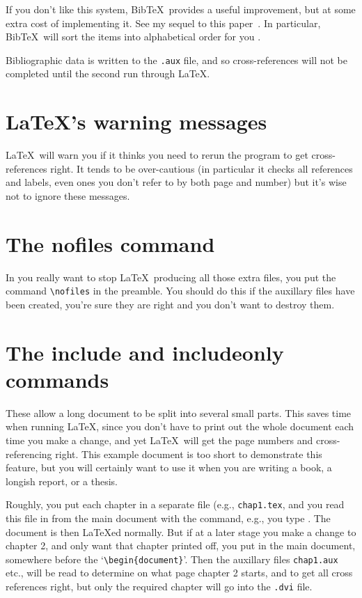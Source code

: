 \documentclass[a4paper]{article}
\begin{document}
If you don't like this system, {\sc Bib}\TeX\ provides
a useful improvement, but at some extra cost of implementing
it. See my sequel to this paper~\cite{extraref}.
In particular, {\sc Bib}\TeX\ will sort the items into
alphabetical order for you \cite{extraref,bibtexguide}.

Bibliographic data is written to the \texttt{.aux} file, and so
cross-references will not be completed until the second run 
through \LaTeX.

\section{\LaTeX's warning messages}

\LaTeX\ will warn you if it thinks you need to rerun 
the program to get cross-references right.  It tends to be
over-cautious (in particular it checks all references and labels,
even ones you don't refer to by both page and number) but it's
wise not to ignore these messages.

\section{The nofiles command}\label{nofilessect}

In you really want to stop \LaTeX\ producing all those extra
files, you put the command \verb|\nofiles| in the preamble. You should do this
if the auxillary files have been created, you're sure they are right
and you don't want to destroy them.

\section{The include and includeonly commands}

These allow a long document to be split into several small parts.
This saves time when running \LaTeX, since you don't have to print out
the whole document each time you make a change, and yet \LaTeX\ will
get the page numbers and cross-referencing right.  This example
document is too short to demonstrate this feature, but you will certainly
want to use it when you are writing a book, a longish report, or a thesis.

Roughly, you put each chapter in a separate file (e.g., \texttt{chap1.tex}, and
you read this file in from the main document with the \verb||
command, e.g., you type \verb||.  
The document is then \LaTeX ed
normally.  But if at a later stage you make a change to chapter 2,
and only want that chapter printed off, you put \verb||
in the main document, somewhere before the `\verb|\begin{document}|'.
Then the auxillary files \texttt{chap1.aux} etc., will be read to determine
on what page chapter 2 starts, and to get all cross references right,
but only the required chapter will go into the \texttt{.dvi} file.
\end{document}
